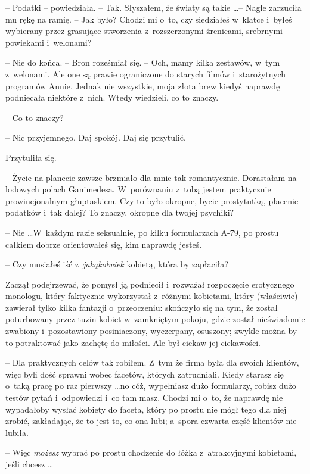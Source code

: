 \documentclass[oneside,polish,11pt,rmheadings]{mwbk}
\begin{document}
-- Podatki -- powiedziała. -- Tak. Słyszałem, że światy są takie \ldots  -- Nagle zarzuciła mu rękę na ramię. -- Jak było? Chodzi mi o~to, czy siedziałeś w~klatce i~byłeś wybierany przez grasujące stworzenia z~rozszerzonymi źrenicami, srebrnymi powiekami i~welonami? 

-- Nie do końca. -- Bron roześmiał się. -- Och, mamy kilka zestawów, w~tym z~welonami. Ale one są prawie ograniczone do starych filmów i~starożytnych programów Annie. Jednak nie wszystkie, moja złota brew kiedyś naprawdę podniecała niektóre z~nich. Wtedy wiedzieli, co to znaczy. 

-- Co to znaczy? 

-- Nic przyjemnego. Daj spokój. Daj się przytulić. 

Przytuliła się. 

-- Życie na planecie zawsze brzmiało dla mnie tak romantycznie. Dorastałam na lodowych polach Ganimedesa. W~porównaniu z~tobą jestem praktycznie prowincjonalnym głuptaskiem. Czy to było okropne, bycie prostytutką, płacenie podatków i~tak dalej? To znaczy, okropne dla twojej psychiki? 

-- Nie \ldots W~każdym razie seksualnie, po kilku formularzach A-79, po prostu całkiem dobrze orientowałeś się, kim naprawdę jesteś. 

-- Czy musiałeś iść z~\textit{jakąkolwiek }kobietą, która by zapłaciła? 

Zaczął podejrzewać, że pomysł ją podniecił i~rozważał rozpoczęcie erotycznego monologu, który faktycznie wykorzystał z~różnymi kobietami, który (właściwie) zawierał tylko kilka fantazji o~przeoczeniu: skończyło się na tym, że został poturbowany przez tuzin kobiet w~zamkniętym pokoju, gdzie został nieświadomie zwabiony i~pozostawiony posiniaczony, wyczerpany, osuszony; zwykle można by to potraktować  jako zachętę do miłości. Ale był ciekaw jej ciekawości. 

-- Dla praktycznych celów tak robiłem. Z~tym że firma była dla swoich klientów, więc byli dość sprawni wobec facetów, których zatrudniali. Kiedy starasz się o~taką pracę po raz pierwszy \ldots  no cóż, wypełniasz dużo formularzy, robisz dużo testów pytań i~odpowiedzi i~co tam masz.  Chodzi mi o~to, że naprawdę nie wypadałoby wysłać kobiety do faceta, który po prostu nie mógł tego dla niej zrobić, zakładając, że to jest to, co ona lubi; a~spora czwarta część klientów nie lubiła. 

-- Więc \textit{możesz} wybrać po prostu chodzenie do łóżka z~atrakcyjnymi kobietami, jeśli chcesz \ldots  
\end{document}
